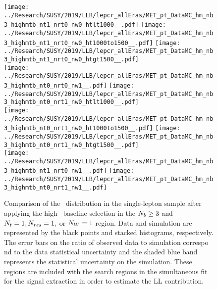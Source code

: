 \begin{figure}[!htb]
	\begin{center}
  \texttt{[image: ../Research/SUSY/2019/LLB/lepcr\_allEras/MET\_pt\_DataMC\_hm\_nb3\_highmtb\_nt1\_nrt0\_nw0\_htlt1000\_\_.pdf]}
  \texttt{[image: ../Research/SUSY/2019/LLB/lepcr\_allEras/MET\_pt\_DataMC\_hm\_nb3\_highmtb\_nt1\_nrt0\_nw0\_ht1000to1500\_\_.pdf]} 
  \texttt{[image: ../Research/SUSY/2019/LLB/lepcr\_allEras/MET\_pt\_DataMC\_hm\_nb3\_highmtb\_nt1\_nrt0\_nw0\_htgt1500\_\_.pdf]} \\
  \texttt{[image: ../Research/SUSY/2019/LLB/lepcr\_allEras/MET\_pt\_DataMC\_hm\_nb3\_highmtb\_nt0\_nrt0\_nw1\_\_.pdf]} 
  \texttt{[image: ../Research/SUSY/2019/LLB/lepcr\_allEras/MET\_pt\_DataMC\_hm\_nb3\_highmtb\_nt0\_nrt1\_nw0\_htlt1000\_\_.pdf]} \\
  \texttt{[image: ../Research/SUSY/2019/LLB/lepcr\_allEras/MET\_pt\_DataMC\_hm\_nb3\_highmtb\_nt0\_nrt1\_nw0\_ht1000to1500\_\_.pdf]}  
  \texttt{[image: ../Research/SUSY/2019/LLB/lepcr\_allEras/MET\_pt\_DataMC\_hm\_nb3\_highmtb\_nt0\_nrt1\_nw0\_htgt1500\_\_.pdf]} \\
  \texttt{[image: ../Research/SUSY/2019/LLB/lepcr\_allEras/MET\_pt\_DataMC\_hm\_nb3\_highmtb\_nt1\_nrt0\_nw1\_\_.pdf]} 
  \texttt{[image: ../Research/SUSY/2019/LLB/lepcr\_allEras/MET\_pt\_DataMC\_hm\_nb3\_highmtb\_nt0\_nrt1\_nw1\_\_.pdf]} \\
	\end{center}
	\caption[Lost Lepton HM Control Region $\nb\geq3$ with 1 heavy object]{Comparison of the \met~distribution in the single-lepton sample after applying the high \dm~baseline selection in the $\nb\geq3$ and $N_{t}=1, N_{res}=1,$ or $N_{W}=1$ region. Data and simulation are represented by the black points and stacked histograms, respectively. The error bars on the ratio of observed data to simulation correspo    nd to the data statistical uncertainty and the shaded blue band represents the statistical uncertainty on the simulation. These regions are included with the search regions in the simultaneous fit for the signal extraction in order to estimate the LL contribution.
	 }
	\label{fig:llb-1lcr-datavsmc-hm-nb3-1}
\end{figure}

